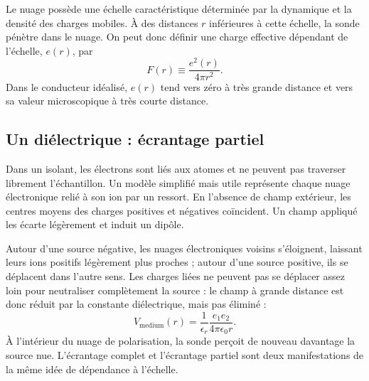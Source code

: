 \begin{classroomqa}\end{classroomqa}

Le nuage possède une échelle caractéristique déterminée par la dynamique et la densité des charges mobiles. À des distances \(r\) inférieures à cette échelle, la sonde pénètre dans le nuage. On peut donc définir une charge effective dépendant de l’échelle, \(e(r)\), par \begin{equation}
  F(r)\equiv\frac{e^2(r)}{4\pi r^2}.
  \label{eq:l10-running-charge-definition}
\end{equation}Dans le conducteur idéalisé, \(e(r)\) tend vers zéro à très grande distance et vers sa valeur microscopique à très courte distance.

\subsection{Un diélectrique : écrantage partiel}

Dans un isolant, les électrons sont liés aux atomes et ne peuvent pas traverser librement l’échantillon. Un modèle simplifié mais utile représente chaque nuage électronique relié à son ion par un ressort. En l’absence de champ extérieur, les centres moyens des charges positives et négatives coïncident. Un champ appliqué les écarte légèrement et induit un dipôle.

Autour d’une source négative, les nuages électroniques voisins s’éloignent, laissant leurs ions positifs légèrement plus proches ; autour d’une source positive, ils se déplacent dans l’autre sens. Les charges liées ne peuvent pas se déplacer assez loin pour neutraliser complètement la source : le champ à grande distance est donc réduit par la constante diélectrique, mais pas éliminé : \begin{equation}
  V_{\mathrm{medium}}(r)
  =
  \frac{1}{\epsilon_r}
  \frac{e_1e_2}{4\pi\epsilon_0r}.
  \label{eq:l10-dielectric-coulomb}
\end{equation}À l’intérieur du nuage de polarisation, la sonde perçoit de nouveau davantage la source nue. L’écrantage complet et l’écrantage partiel sont deux manifestations de la même idée de dépendance à l’échelle.

